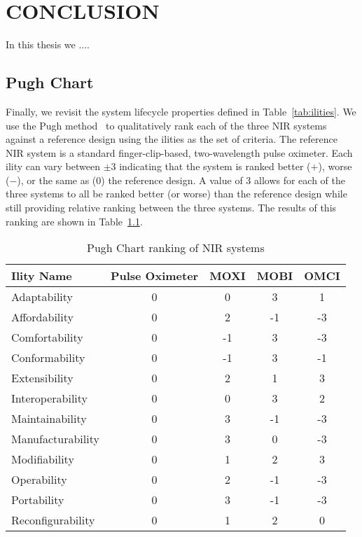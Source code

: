 \chapter{CONCLUSION} %
\label{chap:conclusion}

In this thesis we ....

\section{Pugh Chart}

Finally, we revisit the system lifecycle properties defined in Table~\ref{tab:ilities}. We use the Pugh method~\cite{Pugh1981} to qualitatively rank each of the three \ac{NIR} systems against a reference design using the ilities as the set of criteria. The reference \ac{NIR} system is a standard finger-clip-based, two-wavelength pulse oximeter. Each ility can vary between $\pm3$ indicating that the system is ranked better ($+$), worse ($-$), or the same as ($0$) the reference design. A value of 3 allows for each of the three systems to all be ranked better (or worse) than the reference design while still providing relative ranking between the three systems. The results of this ranking are shown in Table~\ref{tab:pughtable}. 

\begin{table}[]
\centering
\caption{Pugh Chart ranking of \ac{NIR} systems}
\label{tab:pughtable}
\begin{tabular}{@{}lcccc@{}}
\toprule
Ility Name        & Pulse Oximeter & MOXI & MOBI & OMCI \\ \midrule
Adaptability      & 0              & 0    & 3    & 1    \\
Affordability     & 0              & 2    & -1   & -3   \\
Comfortability    & 0              & -1   & 3    & -3   \\
Conformability    & 0              & -1   & 3    & -1   \\
Extensibility     & 0              & 2    & 1    & 3    \\
Interoperability  & 0              & 0    & 3    & 2    \\
Maintainability   & 0              & 3    & -1   & -3   \\
Manufacturability & 0              & 3    & 0    & -3   \\
Modifiability     & 0              & 1    & 2    & 3    \\
Operability       & 0              & 2    & -1   & -3   \\
Portability       & 0              & 3    & -1   & -3   \\
Reconfigurability & 0              & 1    & 2    & 0    \\ \bottomrule
\end{tabular}%
\end{table}


